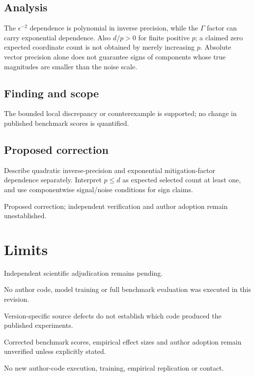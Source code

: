 \documentclass[11pt]{article}
\begin{document}
\subsection*{Analysis}

The \(\epsilon^{-2}\) dependence is polynomial in inverse precision, while the \(\Gamma\) factor can carry exponential dependence. Also \(d/p>0\) for finite positive \(p\); a claimed zero expected coordinate count is not obtained by merely increasing \(p\). Absolute vector precision alone does not guarantee signs of components whose true magnitudes are smaller than the noise scale.

\subsection*{Finding and scope}

The bounded local discrepancy or counterexample is supported; no change in published benchmark scores is quantified.

\subsection*{Proposed correction}

Describe quadratic inverse-precision and exponential mitigation-factor dependence separately. Interpret \(p\le d\) as expected selected count at least one, and use componentwise signal/noise conditions for sign claims.

Proposed correction; independent verification and author adoption remain unestablished.

\section*{Limits}

Independent scientific adjudication remains pending.\par

No author code, model training or full benchmark evaluation was executed in this revision.\par

Version-specific source defects do not establish which code produced the published experiments.\par

Corrected benchmark scores, empirical effect sizes and author adoption remain unverified unless explicitly stated.\par

No new author-code execution, training, empirical replication or contact.\par
\end{document}
